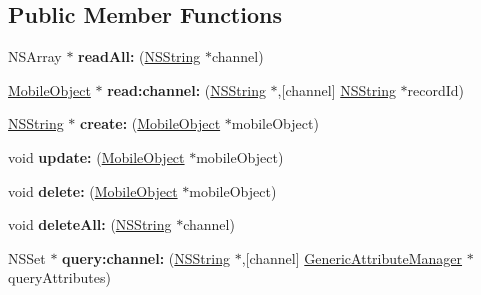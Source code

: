 \subsection*{\-Public \-Member \-Functions}
\begin{DoxyCompactItemize}
\item 
\hypertarget{interface_mobile_object_database_a4fbb5cddb8146e261cc2212c8d90debb}{
\-N\-S\-Array $\ast$ {\bfseries read\-All\-:} (\hyperlink{class_n_s_string}{\-N\-S\-String} $\ast$channel)}
\label{interface_mobile_object_database_a4fbb5cddb8146e261cc2212c8d90debb}

\item 
\hypertarget{interface_mobile_object_database_a10cf83decc48908861d17d9f0141ab18}{
\hyperlink{interface_mobile_object}{\-Mobile\-Object} $\ast$ {\bfseries read\-:channel\-:} (\hyperlink{class_n_s_string}{\-N\-S\-String} $\ast$,\mbox{[}channel\mbox{]} \hyperlink{class_n_s_string}{\-N\-S\-String} $\ast$record\-Id)}
\label{interface_mobile_object_database_a10cf83decc48908861d17d9f0141ab18}

\item 
\hypertarget{interface_mobile_object_database_aeefe5c8508be5e856f06fe8226c44904}{
\hyperlink{class_n_s_string}{\-N\-S\-String} $\ast$ {\bfseries create\-:} (\hyperlink{interface_mobile_object}{\-Mobile\-Object} $\ast$mobile\-Object)}
\label{interface_mobile_object_database_aeefe5c8508be5e856f06fe8226c44904}

\item 
\hypertarget{interface_mobile_object_database_a4018487d7568877e05d30503528867b0}{
void {\bfseries update\-:} (\hyperlink{interface_mobile_object}{\-Mobile\-Object} $\ast$mobile\-Object)}
\label{interface_mobile_object_database_a4018487d7568877e05d30503528867b0}

\item 
\hypertarget{interface_mobile_object_database_ae94e66a2126bb5fd86f15b378a2a2f08}{
void {\bfseries delete\-:} (\hyperlink{interface_mobile_object}{\-Mobile\-Object} $\ast$mobile\-Object)}
\label{interface_mobile_object_database_ae94e66a2126bb5fd86f15b378a2a2f08}

\item 
\hypertarget{interface_mobile_object_database_aa48df42f15b752f96c70061ff587b793}{
void {\bfseries delete\-All\-:} (\hyperlink{class_n_s_string}{\-N\-S\-String} $\ast$channel)}
\label{interface_mobile_object_database_aa48df42f15b752f96c70061ff587b793}

\item 
\hypertarget{interface_mobile_object_database_a7cfe2fde7fad0c56172554905c73915d}{
\-N\-S\-Set $\ast$ {\bfseries query\-:channel\-:} (\hyperlink{class_n_s_string}{\-N\-S\-String} $\ast$,\mbox{[}channel\mbox{]} \hyperlink{interface_generic_attribute_manager}{\-Generic\-Attribute\-Manager} $\ast$query\-Attributes)}
\label{interface_mobile_object_database_a7cfe2fde7fad0c56172554905c73915d}


\end{DoxyCompactItemize}
